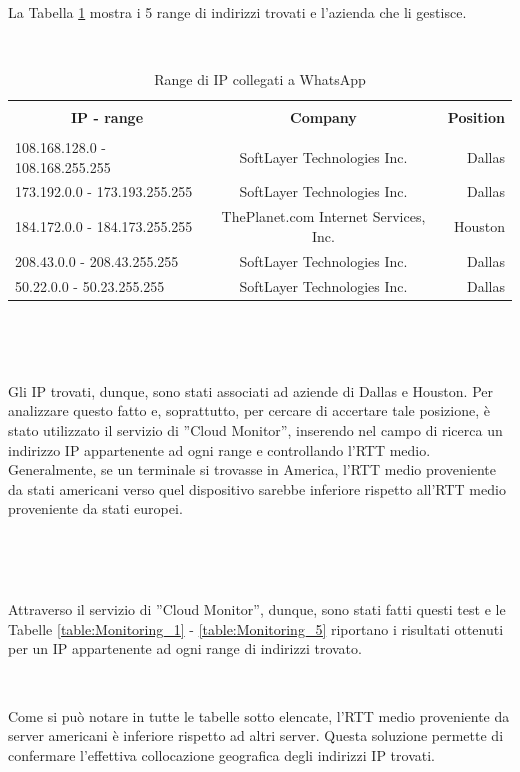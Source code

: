 \documentclass[a4paper,11pt]{book}
\begin{document}
~

La Tabella \ref{table:ip} mostra i 5 range di indirizzi trovati e l'azienda che li gestisce.

~

\begin{table}[!htb]
\begin{tabular}{|l|c|r|}
\hline
\multicolumn{1}{|c|}{\textbf{}} & {\textbf{}} & {\textbf{}}\\
\multicolumn{1}{|c|}{\textbf{IP - range}} & {\textbf{Company}} & {\textbf{Position}}\\
\multicolumn{1}{|c|}{\textbf{}} & {\textbf{}} & {\textbf{}}\\
\hline
108.168.128.0 - 108.168.255.255 &  SoftLayer Technologies Inc. & Dallas\\
173.192.0.0 - 173.193.255.255 &  SoftLayer Technologies Inc. & Dallas\\
184.172.0.0 - 184.173.255.255 &  ThePlanet.com Internet Services, Inc. & Houston\\
208.43.0.0 - 208.43.255.255 &  SoftLayer Technologies Inc. & Dallas\\
50.22.0.0 - 50.23.255.255 &  SoftLayer Technologies Inc. & Dallas\\
\hline
\end{tabular}
\caption{Range di IP collegati a WhatsApp}\label{table:ip}
\end{table}


~

~


Gli IP trovati, dunque, sono stati associati ad aziende di Dallas e Houston. 
Per analizzare questo fatto e, soprattutto, per cercare di accertare tale posizione, \`e stato utilizzato il servizio di ''Cloud Monitor'', inserendo nel campo di ricerca un indirizzo IP appartenente ad ogni range e controllando l'RTT medio. 
Generalmente, se un terminale si trovasse in America, l'RTT medio proveniente da stati americani verso quel dispositivo sarebbe inferiore rispetto all'RTT medio proveniente da stati europei.

~

~

Attraverso il servizio di ''Cloud Monitor'', dunque, sono stati fatti questi test e le Tabelle \ref{table:Monitoring_1} - \ref{table:Monitoring_5} riportano i risultati ottenuti per un IP appartenente ad ogni range di indirizzi trovato.

~

Come si pu\`o notare in tutte le tabelle sotto elencate, l'RTT medio proveniente da server americani è inferiore rispetto ad altri server. Questa soluzione permette di confermare l'effettiva collocazione geografica degli indirizzi IP trovati.
\end{document}
